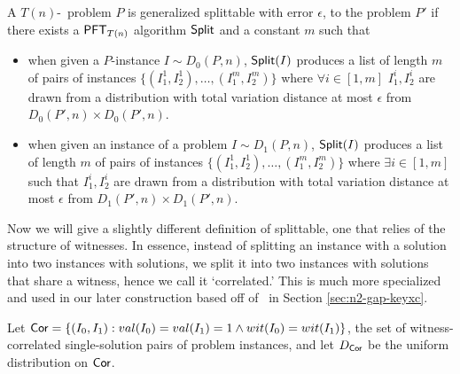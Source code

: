 \begin{definition}\label{def:gen-split}
	A $T(n)$-\ACIH~problem $P$ is generalized splittable with error $\epsilon$, to the problem $P'$ if there exists a $\mathsf{PFT}_{T(n)}$ algorithm $\mathsf{Split}$ and a constant $m$ such that
	\begin{itemize}
		\item when given a $P$-instance $I \sim D_{0}(P,n)$, $\mathsf{Split}(I)$ produces a list of length $m$ of pairs of instances  $\{(I_1^1,I_2^1),\ldots,(I_1^m,I_2^m)\}$ where  $\forall i\in [1,m]$ $I_1^i,I_2^i$ are drawn from a distribution with total variation distance at most $\epsilon$ from $D_{0}(P',n)\times D_0(P',n)$.
		\item when given an instance of a problem $I \sim D_{1}(P,n)$, $\mathsf{Split}(I)$ produces a list of length $m$ of pairs of instances  $\{(I_1^1,I_2^1),\ldots,(I_1^m,I_2^m)\}$ where $\exists i\in[1,m]$ such that $I_1^i,I_2^i$ are drawn from a distribution with total variation distance at most $\epsilon$ from $D_{1}(P',n)\times D_1(P',n)$.
	\end{itemize}
\end{definition}

Now we will give a slightly different definition of splittable, one that relies of the structure of witnesses. In essence, instead of splitting an instance with a solution into two instances with solutions, we split it into two instances with solutions that share a witness, hence we call it `correlated.' This is much more specialized and used in our later construction based off of \zkclique~in Section \ref{sec:n2-gap-keyxc}.

Let $\mathsf{Cor} = \{ (I_0, I_1) : val(I_0) = val(I_1) = 1 \land wit(I_0) = wit(I_1) \}$, the set of witness-correlated single-solution pairs of problem instances, and let $D_{\mathsf{Cor}}$ be the uniform distribution on $\mathsf{Cor}$.

